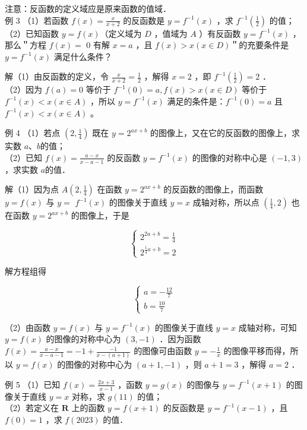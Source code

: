 \documentclass[10pt]{article}
\begin{document}
注意：反函数的定义域应是原来函数的值域．\\
例 3 （1）若函数 \(f(x)=\frac{x}{x+2}\) 的反函数是 \(y=f^{-1}(x)\) ，求 \(f^{-1}\left(\frac{1}{2}\right)\) 的值；\\
（2）已知函数 \(y=f(x)\)（定义域为 \(D\) ，值域为 \(A\) ）有反函数 \(y=f^{-1}(x)\) ，那么＂方程 \(f(x)=\) 0 有解 \(x=a\) ，且 \(f(x)>x(x \in D)\)＂的充要条件是 \(y=f^{-1}(x)\) 满足什么条件？

解（1）由反函数的定义，令 \(\frac{x}{x+2}=\frac{1}{2}\) ，解得 \(x=2\) ，即 \(f^{-1}\left(\frac{1}{2}\right)=2\) ．\\
（2）因为 \(f(a)=0\) 等价于 \(f^{-1}(0)=a, f(x)>x(x \in D)\) 等价于 \(f^{-1}(x)<x(x \in A)\) ，所以 \(y=f^{-1}(x)\) 满足的条件是：\(f^{-1}(0)=a\) 且 \(f^{-1}(x)<x(x \in A)\) 。

例 4 （1）若点 \(\left(2, \frac{1}{4}\right)\) 既在 \(y=2^{a x+b}\) 的图像上，又在它的反函数的图像上，求实数 \(a 、 b\)的值；\\
（2）已知 \(f(x)=\frac{a-x}{x-a-1}\) 的反函数 \(y=f^{-1}(x)\) 的图像的对称中心是 \((-1,3)\) ，求实数 \(a\)的值．

解（1）因为点 \(A\left(2, \frac{1}{4}\right)\) 在函数 \(y=2^{a x+b}\) 的反函数的图像上，而函数 \(y=f(x)\) 与 \(y=\) \(f^{-1}(x)\) 的图像关于直线 \(y=x\) 成轴对称，所以点 \(\left(\frac{1}{4}, 2\right)\) 也在函数 \(y=2^{a x+b}\) 的图像上，于是

\[
\left\{\begin{array}{l}
2^{2 a+b}=\frac{1}{4} \\
2^{\frac{1}{4} a+b}=2
\end{array}\right.
\]

解方程组得

\[
\left\{\begin{array}{l}
a=-\frac{12}{7} \\
b=\frac{10}{7}
\end{array}\right.
\]

（2）由函数 \(y=f(x)\) 与 \(y=f^{-1}(x)\) 的图像关于直线 \(y=x\) 成轴对称，可知 \(y=f(x)\) 的图像的对称中心为 \((3,-1)\) ．因为函数 \(f(x)=\frac{a-x}{x-a-1}=-1+\frac{-1}{x-(a+1)}\) 的图像可由函数 \(y=-\frac{1}{x}\) 的图像平移而得，所以 \(y=f(x)\) 的图像的对称中心为 \((a+1,-1)\) ，则 \(a+1=3\) ，解得 \(a=2\) ．

例 5 （1）已知 \(f(x)=\frac{2 x+3}{x-1}\) ，函数 \(y=g(x)\) 的图像与 \(y=f^{-1}(x+1)\) 的图像关于直线 \(y=x\) 对称，求 \(g(11)\) 的值；\\
（2）若定义在 \(\mathbf{R}\) 上的函数 \(y=f(x+1)\) 的反函数是 \(y=f^{-1}(x-1)\) ，且 \(f(0)=1\) ，求 \(f(2023)\) 的值．
\end{document}
